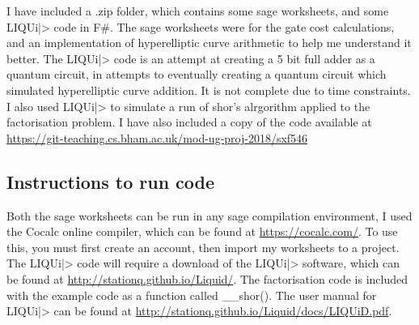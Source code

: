 I have included a .zip folder, which contains some sage worksheets, and some {LIQU}i|> code in F\#. The sage worksheets were for the gate cost calculations, and an implementation of hyperelliptic curve arithmetic to help me understand it better. The {LIQU}i|> code is an attempt at creating a 5 bit full adder as a quantum circuit, in attempts to eventually creating a quantum circuit which simulated hyperelliptic curve addition. It is not complete due to time constraints. I also used {LIQU}i|> to simulate a run of shor's alrgorithm applied to the factorisation problem.
I have also included a copy of the code available at \url{https://git-teaching.cs.bham.ac.uk/mod-ug-proj-2018/sxf546}
\subsection{Instructions to run code}
Both the sage worksheets can be run in any sage compilation environment, I used the Cocalc online compiler, which can be found at \url{https://cocalc.com/}. To use this, you must first create an account, then import my worksheets to a project.
The {LIQU}i|> code will require a download of the {LIQU}i|> software, which can be found at \url{http://stationq.github.io/Liquid/}. The factorisation code is included with the example code as a function called \_\_shor(). The user manual for {LIQU}i|> can be found at \url{http://stationq.github.io/Liquid/docs/LIQUiD.pdf}.